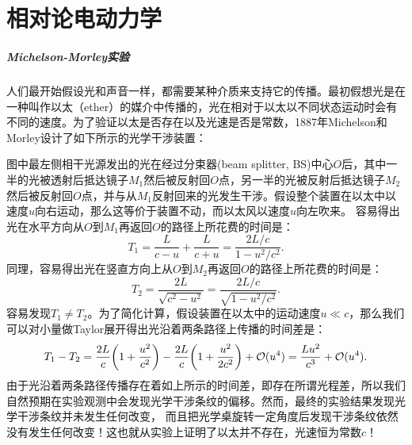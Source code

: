 \chapter{相对论电动力学}
\label{chap:relativistic electromagnetic}
\paragraph{Michelson-Morley实验}
人们最开始假设光和声音一样，都需要某种介质来支持它的传播。最初假想光是在一种叫作以太（ether）的媒介中传播的，光在相对于以太以不同状态运动时会有不同的速度。为了验证以太是否存在以及光速是否是常数，1887年Michelson和Morley设计了如下所示的光学干涉装置：
\begin{center}
\end{center}
图中最左侧相干光源发出的光在经过分束器(beam splitter, BS)中心$O$后，其中一半的光被透射后抵达镜子$M_1$然后被反射回$O$点，另一半的光被反射后抵达镜子$M_2$然后被反射回$O$点，并与从$M_1$反射回来的光发生干涉。假设整个装置在以太中以速度$u$向右运动，那么这等价于装置不动，而以太风以速度$u$向左吹来。%
容易得出光在水平方向从$O$到$M_1$再返回$O$的路径上所花费的时间是：
\[
	T_1=\frac L{c-u}+\frac L{c+u}=\frac{2L/c}{1-u^2/c^2}.
\]
同理，容易得出光在竖直方向上从$O$到$M_2$再返回$O$的路径上所花费的时间是：
\[
	T_2=\frac{2L}{\sqrt{c^2-u^2}}=\frac{2L/c}{\sqrt{1-u^2/c^2}}.
\]
容易发现$T_1\neq T_2$。为了简化计算，假设装置在以太中的运动速度$u\ll c$，那么我们可以对小量做Taylor展开得出光沿着两条路径上传播的时间差是：
\[
	T_1-T_2=\frac{2L}c\biggl(1+\frac{u^2}{c^2}\biggr)-\frac{2L}c\biggl(1+\frac{u^2}{2c^2}\biggr)+\mathcal O(u^4)=\frac{Lu^2}{c^3}+\mathcal O(u^4).
\]
由于光沿着两条路径传播存在着如上所示的时间差，即存在所谓光程差，所以我们自然预期在实验观测中会发现光学干涉条纹的偏移。然而，最终的实验结果发现光学干涉条纹并未发生任何改变，%
而且把光学桌旋转一定角度后发现干涉条纹依然没有发生任何改变！这也就从实验上证明了以太并不存在，光速恒为常数$c$！
